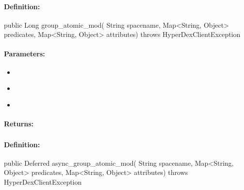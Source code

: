 \paragraph{Definition:}
\begin{javacode}
public Long group_atomic_mod(
        String spacename,
        Map<String, Object> predicates,
        Map<String, Object> attributes) throws HyperDexClientException
\end{javacode}

\paragraph{Parameters:}
\begin{itemize}[noitemsep]
\item {}\\

\item {}\\

\item {}\\

\end{itemize}

\paragraph{Returns:}


\pagebreak
\subsubsection{}
\label{api:java:async_group_atomic_mod}


\paragraph{Definition:}
\begin{javacode}
public Deferred async_group_atomic_mod(
        String spacename,
        Map<String, Object> predicates,
        Map<String, Object> attributes) throws HyperDexClientException
\end{javacode}

